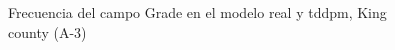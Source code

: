 \begin{figure}[H]
    \centering
    
    \caption{Frecuencia del campo Grade en el modelo real y tddpm, King county (A-3)}
    \label{frecuency-tddpm-grade}
\end{figure}